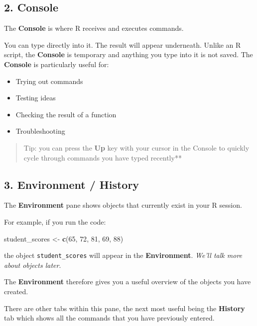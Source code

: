 \documentclass[
]{book}
\newenvironment{Shaded}{\begin{snugshade}}{\end{snugshade}}
\newcommand{\DecValTok}[1]{\textcolor[rgb]{0.00,0.00,0.81}{#1}}
\newcommand{\FunctionTok}[1]{\textcolor[rgb]{0.13,0.29,0.53}{\textbf{#1}}}
\newcommand{\NormalTok}[1]{#1}
\newcommand{\OtherTok}[1]{\textcolor[rgb]{0.56,0.35,0.01}{#1}}
\providecommand{\tightlist}{%
  \setlength{\itemsep}{0pt}\setlength{\parskip}{0pt}}
\begin{document}
\subsection{2. Console}\label{console}

The \textbf{Console} is where R receives and executes commands.

You can type directly into it. The result will appear underneath. Unlike an R script, the \textbf{Console} is temporary and anything you type into it is not saved. The \textbf{Console} is particularly useful for:

\begin{itemize}
\tightlist
\item
  Trying out commands
\item
  Testing ideas
\item
  Checking the result of a function
\item
  Troubleshooting
\end{itemize}

\begin{quote}
Tip: you can press the \textbf{Up} key with your cursor in the Console to quickly cycle through commands you have typed recently**
\end{quote}

\subsection{3. Environment / History}\label{environment-history}

The \textbf{Environment} pane shows objects that currently exist in your R session.

For example, if you run the code:

\begin{Shaded}
\begin{Highlighting}[]
\NormalTok{student\_scores }\OtherTok{\textless{}{-}} \FunctionTok{c}\NormalTok{(}\DecValTok{65}\NormalTok{, }\DecValTok{72}\NormalTok{, }\DecValTok{81}\NormalTok{, }\DecValTok{69}\NormalTok{, }\DecValTok{88}\NormalTok{)}
\end{Highlighting}
\end{Shaded}

the object \texttt{student\_scores} will appear in the \textbf{Environment}. \emph{We'll talk more about objects later}.

The \textbf{Environment} therefore gives you a useful overview of the objects you have created.

There are other tabs within this pane, the next most useful being the \textbf{History} tab which shows all the commands that you have previously entered.
\end{document}
